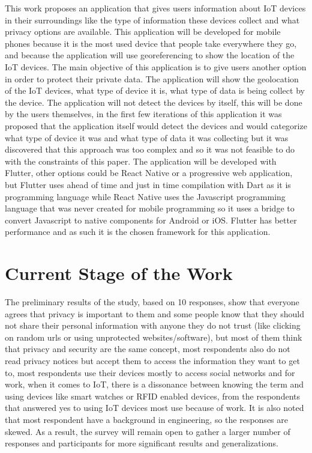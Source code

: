 This work proposes an application that gives users information about IoT
devices in their surroundings like the type of information these devices
collect and what privacy options are available. This application will be
developed for mobile phones because it is the most used device that people
take everywhere they go, and because the application will use georeferencing
to show the location of the IoT devices. The main objective of this application
is to give users another option in order to protect their private data.
The application will show the geolocation of the IoT devices, what type
of device it is, what type of data is being collect by the device. The application
will not detect the devices by itself, this will be done by the users themselves,
in the first few iterations of this application it was proposed that the
application itself would detect the devices and would categorize what type
of device it was and what type of data it was collecting but it was discovered
that this approach was too complex and so it was not feasible to do with
the constraints of this paper. The application will be developed with Flutter,
other options could be React Native or a progressive web application, but
Flutter uses ahead of time and just in time compilation with Dart as it
is programming language while React Native uses the Javascript programming
language that was never created for mobile programming so it uses a bridge
to convert Javascript to native components for Android or iOS. Flutter has
better performance and as such it is the chosen framework for this application.

\section{Current Stage of the Work}

The preliminary results of the study, based on 10 responses, show that everyone
agrees that privacy is important to them and some people know that they
should not share their personal information with anyone they do not trust
(like clicking on random urls or using unprotected websites/software), but
most of them think that privacy and security are the same concept, most
respondents also do not read privacy notices but accept them to access the
information they want to get to, most respondents use their devices mostly
to access social networks and for work, when it comes to IoT, there is a
dissonance between knowing the term and using devices like smart watches
or RFID enabled devices, from the respondents that answered yes to using
IoT devices most use because of work. It is also noted that most respondent
have a background in engineering, so the responses are skewed. As a result,
the survey will remain open to gather a larger number of responses and participants
for more significant results and generalizations.

